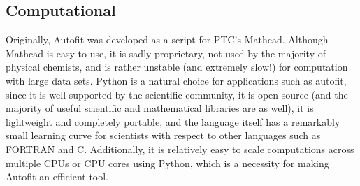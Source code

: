 \documentclass[letterpaper,10pt,english]{sphinxmanual}
\begin{document}
\subsection{Computational}
\label{intro:computational}
Originally, Autofit was developed as a script for PTC's Mathcad. Although Mathcad is easy to use, it is sadly proprietary, not used by the majority
of physical chemists, and is rather unstable (and extremely slow!) for computation with large data sets. Python is a natural choice for applications such as autofit,
since it is well supported by the scientific community, it is open source (and the majority of useful scientific and mathematical libraries are as well), it is lightweight
and completely portable, and the language itself has a remarkably small learning curve for scientists with respect to other languages such as FORTRAN and C. Additionally,
it is relatively easy to scale computations across multiple CPUs or CPU cores using Python, which is a necessity for making Autofit an efficient tool.
\end{document}
